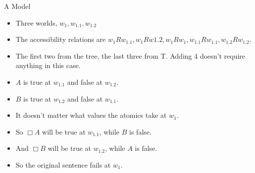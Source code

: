 \documentclass[
  ignorenonframetext,
]{beamer}
\providecommand{\tightlist}{%
  \setlength{\itemsep}{0pt}\setlength{\parskip}{0pt}}
\renewcommand{\,}{\text{, }}
\begin{document}
\begin{frame}{A Model}
\protect\hypertarget{a-model}{}

\begin{itemize}
\tightlist
\item
  Three worlds, \(w_1, w_{1.1}, w_{1.2}\)
\item
  The accessibility relations are
  \(w_1Rw_{1.1}, w_1Rw{1.2}, w_1Rw_1, w_{1.1}Rw_{1.1}, w_{1.2}Rw_{1.2}\).
\item
  The first two from the tree, the last three from T. Adding 4 doesn't
  require anything in this case.
\item
  \(A\) is true at \(w_{1.1}\) and false at \(w_{1.2}\).
\item
  \(B\) is true at \(w_{1.2}\) and false at \(w_{1.1}\).
\item
  It doesn't matter what values the atomics take at \(w_1\).
\item
  So \(\Box A\) will be true at \(w_{1.1}\), while \(B\) is false.
\item
  And \(\Box B\) will be true at \(w_{1.2}\), while \(A\) is false.
\item
  So the original sentence fails at \(w_1\).
\end{itemize}

\end{frame}
\end{document}
